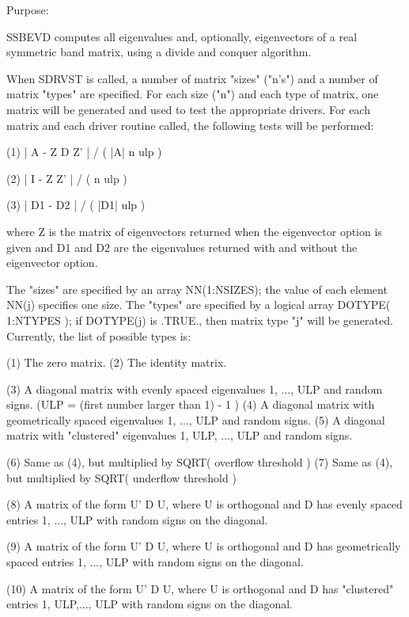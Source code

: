 \begin{DoxyParagraph}{Purpose\+: }
\begin{DoxyVerb}
              SSBEVD computes all eigenvalues and, optionally,
              eigenvectors of a real symmetric band matrix,
              using a divide and conquer algorithm.

      When SDRVST is called, a number of matrix "sizes" ("n's") and a
      number of matrix "types" are specified.  For each size ("n")
      and each type of matrix, one matrix will be generated and used
      to test the appropriate drivers.  For each matrix and each
      driver routine called, the following tests will be performed:

      (1)     | A - Z D Z' | / ( |A| n ulp )

      (2)     | I - Z Z' | / ( n ulp )

      (3)     | D1 - D2 | / ( |D1| ulp )

      where Z is the matrix of eigenvectors returned when the
      eigenvector option is given and D1 and D2 are the eigenvalues
      returned with and without the eigenvector option.

      The "sizes" are specified by an array NN(1:NSIZES); the value of
      each element NN(j) specifies one size.
      The "types" are specified by a logical array DOTYPE( 1:NTYPES );
      if DOTYPE(j) is .TRUE., then matrix type "j" will be generated.
      Currently, the list of possible types is:

      (1)  The zero matrix.
      (2)  The identity matrix.

      (3)  A diagonal matrix with evenly spaced eigenvalues
           1, ..., ULP  and random signs.
           (ULP = (first number larger than 1) - 1 )
      (4)  A diagonal matrix with geometrically spaced eigenvalues
           1, ..., ULP  and random signs.
      (5)  A diagonal matrix with "clustered" eigenvalues
           1, ULP, ..., ULP and random signs.

      (6)  Same as (4), but multiplied by SQRT( overflow threshold )
      (7)  Same as (4), but multiplied by SQRT( underflow threshold )

      (8)  A matrix of the form  U' D U, where U is orthogonal and
           D has evenly spaced entries 1, ..., ULP with random signs
           on the diagonal.

      (9)  A matrix of the form  U' D U, where U is orthogonal and
           D has geometrically spaced entries 1, ..., ULP with random
           signs on the diagonal.

      (10) A matrix of the form  U' D U, where U is orthogonal and
           D has "clustered" entries 1, ULP,..., ULP with random
           signs on the diagonal.


\end{DoxyVerb}
\end{DoxyParagraph}
